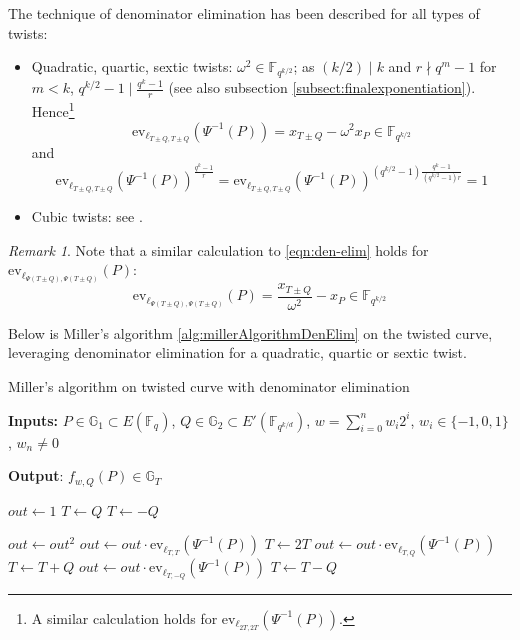 \documentclass{article}
\newcommand{\gOne}{\mathbb{G}_1}
\newcommand{\gTwo}{\mathbb{G}_2}
\newcommand{\gT}{\mathbb{G}_T}
\newcommand{\ev}{\mathrm{ev}}
\newcommand{\fq}[1]{\mathbb{F}_{q^{#1}}}
\theoremstyle{remark}
\newtheorem{remark}{Remark}[section]
\theoremstyle{plain}
\begin{document}
The technique of denominator elimination has been described for all types of twists:
\begin{itemize}
    \item Quadratic, quartic, sextic twists: $\omega^2 \in \fq{k/2}$; as $(k/2) \mid k$ and $r \nmid q^m - 1$ for $m < k$, $q^{k/2} - 1 \mid \frac{q^k - 1}{r}$ (see also subsection \ref{subsect:finalexponentiation}). Hence\footnote{A similar calculation holds for $\ev_{\ell_{2T,2T}}(\Psi^{-1}(P))$.}
    \begin{equation}
        \label{eqn:den-elim}
        \ev_{\ell_{T \pm Q, T \pm Q}}(\Psi^{-1}(P)) = x_{T \pm Q} - \omega^2 x_P \in \fq{k/2}
    \end{equation}
    and
    \[
        \ev_{\ell_{T \pm Q, T \pm Q}}(\Psi^{-1}(P))^{\frac{q^k-1}{r}} = \ev_{\ell_{T \pm Q, T \pm Q}}(\Psi^{-1}(P))^{(q^{k/2}-1)\frac{q^k-1}{(q^{k/2}-1)r}} = 1
    \]
    \item Cubic twists: see \cite[Lem. 1]{LZZW-cubic-den-elim}.
\end{itemize}

\begin{remark}
    Note that a similar calculation to \eqref{eqn:den-elim} holds for $\ev_{\ell_{\Psi(T \pm Q), \Psi(T \pm Q)}}(P)$:
    \[
        \ev_{\ell_{\Psi(T \pm Q), \Psi(T \pm Q)}}(P) = \frac{x_{T \pm Q}}{\omega^2} - x_P \in \fq{k/2}
    \]
\end{remark}

Below is Miller's algorithm \eqref{alg:millerAlgorithmDenElim} on the twisted curve, leveraging denominator elimination for a quadratic, quartic or sextic twist.
\begin{algorithm}
    \caption{\small Miller's algorithm on twisted curve with denominator elimination}\label{alg:millerAlgorithmDenElim}
    \textbf{Inputs:} $P \in \gOne \subset E(\fq{})$, $Q \in \gTwo \subset E'(\fq{k/d})$, $w = \sum_{i=0}^n w_i 2^i$, $w_i \in \{-1,0,1\}$, $w_n \neq 0$

    \textbf{Output}: $f_{w,Q}(P) \in \gT$
    \begin{algorithmic}
        \State $out \gets 1$
            \State $T \gets Q$
        \Else
            \State $T \gets -Q$
        \EndIf

        \State $out \gets out^2$
        \State $out \gets out \cdot \ev_{\ell_{T,T}}(\Psi^{-1}(P))$
        \State $T \gets 2T$
            \State $out \gets out \cdot \ev_{\ell_{T,Q}}(\Psi^{-1}(P))$
            \State $T \gets T + Q$
        \Else
            \State $out \gets out \cdot \ev_{\ell_{T,-Q}}(\Psi^{-1}(P))$
            \State $T \gets T - Q$
        \EndIf
        \EndFor
    \end{algorithmic}
\end{algorithm}
\end{document}
